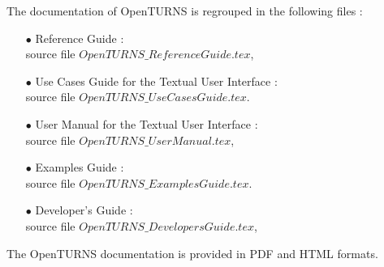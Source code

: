 \documentclass[11pt]{article}
\begin{document}
The documentation of OpenTURNS is regrouped in the following files :
\begin{itemize}
\item[$\bullet$] Reference Guide : \\
  source file $OpenTURNS\_ReferenceGuide.tex$,
\item[$\bullet$] Use Cases Guide for the Textual User Interface : \\
  source file $OpenTURNS\_UseCasesGuide.tex$.
\item[$\bullet$] User Manual for the Textual User Interface : \\
  source file $OpenTURNS\_UserManual.tex$,
\item[$\bullet$] Examples Guide : \\
  source file $OpenTURNS\_ExamplesGuide.tex$.
\item[$\bullet$] Developer's Guide : \\
  source file $OpenTURNS\_DevelopersGuide.tex$,
\end{itemize}
\vspace*{0.5cm}
The OpenTURNS documentation is provided in PDF and HTML formats.
\end{document}
